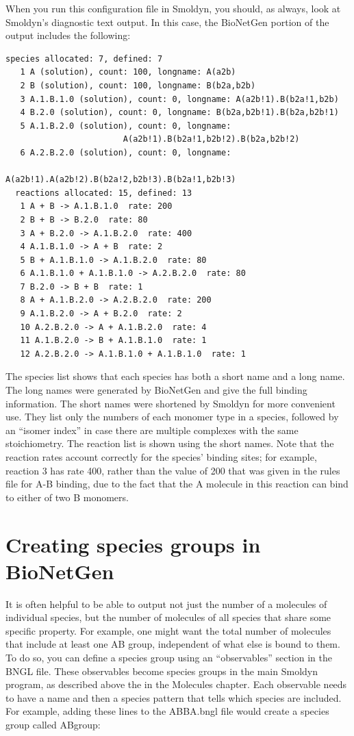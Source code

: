\documentclass {scrbook}
\begin{document}
When you run this configuration file in Smoldyn, you should, as always, look at Smoldyn's diagnostic text output. In this case, the BioNetGen portion of the output includes the following:

\begin{lstlisting}[style=SSAC]
 species allocated: 7, defined: 7
   1 A (solution), count: 100, longname: A(a2b)
   2 B (solution), count: 100, longname: B(b2a,b2b)
   3 A.1.B.1.0 (solution), count: 0, longname: A(a2b!1).B(b2a!1,b2b)
   4 B.2.0 (solution), count: 0, longname: B(b2a,b2b!1).B(b2a,b2b!1)
   5 A.1.B.2.0 (solution), count: 0, longname:
						A(a2b!1).B(b2a!1,b2b!2).B(b2a,b2b!2)
   6 A.2.B.2.0 (solution), count: 0, longname:
						A(a2b!1).A(a2b!2).B(b2a!2,b2b!3).B(b2a!1,b2b!3)
  reactions allocated: 15, defined: 13
   1 A + B -> A.1.B.1.0  rate: 200
   2 B + B -> B.2.0  rate: 80
   3 A + B.2.0 -> A.1.B.2.0  rate: 400
   4 A.1.B.1.0 -> A + B  rate: 2
   5 B + A.1.B.1.0 -> A.1.B.2.0  rate: 80
   6 A.1.B.1.0 + A.1.B.1.0 -> A.2.B.2.0  rate: 80
   7 B.2.0 -> B + B  rate: 1
   8 A + A.1.B.2.0 -> A.2.B.2.0  rate: 200
   9 A.1.B.2.0 -> A + B.2.0  rate: 2
   10 A.2.B.2.0 -> A + A.1.B.2.0  rate: 4
   11 A.1.B.2.0 -> B + A.1.B.1.0  rate: 1
   12 A.2.B.2.0 -> A.1.B.1.0 + A.1.B.1.0  rate: 1
\end{lstlisting}

The species list shows that each species has both a short name and a long name. The long names were generated by BioNetGen and give the full binding information. The short names were shortened by Smoldyn for more convenient use. They list only the numbers of each monomer type in a species, followed by an ``isomer index'' in case there are multiple complexes with the same stoichiometry. The reaction list is shown using the short names. Note that the reaction rates account correctly for the species' binding sites; for example, reaction 3 has rate 400, rather than the value of 200 that was given in the rules file for A-B binding, due to the fact that the A molecule in this reaction can bind to either of two B monomers.

\section{Creating species groups in BioNetGen}

It is often helpful to be able to output not just the number of a molecules of individual species, but the number of molecules of all species that share some specific property. For example, one might want the total number of molecules that include at least one AB group, independent of what else is bound to them. To do so, you can define a species group using an ``observables'' section in the BNGL file. These observables become species groups in the main Smoldyn program, as described above the in the Molecules chapter. Each observable needs to have a name and then a species pattern that tells which species are included. For example, adding these lines to the ABBA.bngl file would create a species group called ABgroup:
\end{document}
